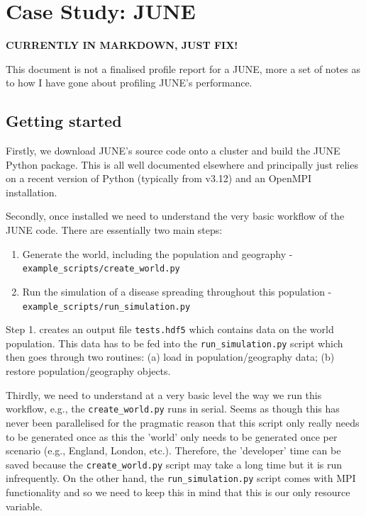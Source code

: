 \chapter{Case Study: JUNE}
\label{chapter:june}
\textbf{CURRENTLY IN MARKDOWN, JUST FIX!}

This document is not a finalised profile report for a JUNE, more a set of notes
as to how I have gone about profiling JUNE's performance.

\section{Getting started}
Firstly, we download JUNE's source code onto a cluster and build the JUNE
Python package. This is all well documented elsewhere and principally just
relies on a recent version of Python (typically from v3.12) and an OpenMPI
installation.

Secondly, once installed we need to understand the very basic workflow of the
JUNE code. There are essentially two main steps:
\begin{enumerate}
    \item Generate the world, including the population and geography - \\
   \verb|example_scripts/create_world.py|
   \item Run the simulation of a disease spreading throughout this population - \\
   \verb|example_scripts/run_simulation.py|
\end{enumerate}
 
Step 1. creates an output file \verb|tests.hdf5| which contains data on the world
population. This data has to be fed into the \verb|run_simulation.py| script which
then goes through two routines: (a) load in population/geography data; (b)
restore population/geography objects.

Thirdly, we need to understand at a very basic level the way we run this
workflow, e.g., the \verb|create_world.py| runs in serial. Seems as though this has
never been parallelised for the pragmatic reason that this script only really
needs to be generated once as this the 'world' only needs to be generated once
per scenario (e.g., England, London, etc.). Therefore, the 'developer' time can
be saved because the \verb|create_world.py| script may take a long time but it is
run infrequently. On the other hand, the \verb|run_simulation.py| script comes with
MPI functionality and so we need to keep this in mind that this is our only
resource variable.

